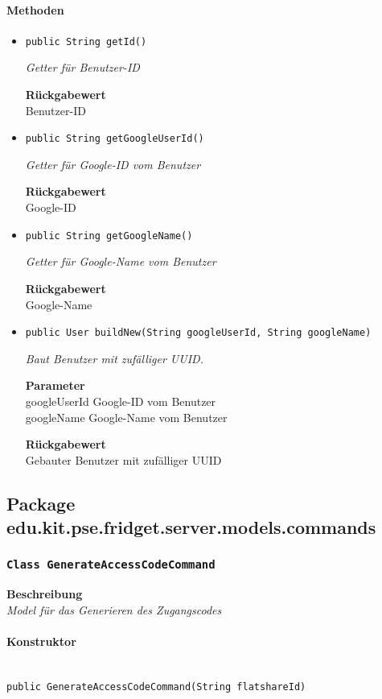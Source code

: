     \paragraph*{Methoden}
    \begin{itemize}
    	\item{\texttt{public String getId()}}
    	
    	\textit{Getter für Benutzer-ID}
    	
    	
    	
    	\textbf{Rückgabewert} \\
    	Benutzer-ID        \item{\texttt{public String getGoogleUserId()}}
    	
    	\textit{Getter für Google-ID vom Benutzer}
    	
    	
    	
    	\textbf{Rückgabewert} \\
    	Google-ID        \item{\texttt{public String getGoogleName()}}
    	
    	\textit{Getter für Google-Name vom Benutzer}
    	
    	
    	
    	\textbf{Rückgabewert} \\
    	Google-Name        \item{\texttt{public User buildNew(String googleUserId, String googleName)}}
    	
    	\textit{Baut Benutzer mit zufälliger UUID.}
    	
    	\textbf{Parameter} \\
    	googleUserId Google-ID vom Benutzer\\
    	googleName Google-Name vom Benutzer
    	
    	\textbf{Rückgabewert} \\
    	Gebauter Benutzer mit zufälliger UUID
    \end{itemize}
    \subsection{Package edu.kit.pse.fridget.server.models.commands}
    \subsubsection{\texttt{Class GenerateAccessCodeCommand}}
    \textbf{Beschreibung} \\
    \textit{Model für das Generieren des Zugangscodes}
    \paragraph*{Konstruktor}\mbox{} \\
    \texttt{public GenerateAccessCodeCommand(String flatshareId)} \\
